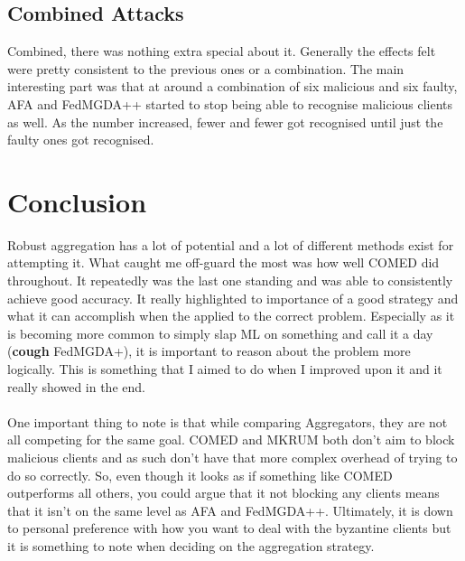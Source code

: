 \subsection{Combined Attacks}
Combined, there was nothing extra special about it.
Generally the effects felt were pretty consistent to the previous ones or a combination.
The main interesting part was that at around a combination of six malicious and six faulty, AFA and FedMGDA++ started to stop being able to recognise malicious clients as well.
As the number increased, fewer and fewer got recognised until just the faulty ones got recognised.

\section{Conclusion}
Robust aggregation has a lot of potential and a lot of different methods exist for attempting it.
What caught me off-guard the most was how well COMED did throughout.
It repeatedly was the last one standing and was able to consistently achieve good accuracy.
It really highlighted to importance of a good strategy and what it can accomplish when the applied to the correct problem.
Especially as it is becoming more common to simply slap ML on something and call it a day (\textbf{cough} FedMGDA+), it is important to reason about the problem more logically.
This is something that I aimed to do when I improved upon it and it really showed in the end.
\\ \\
One important thing to note is that while comparing Aggregators, they are not all competing for the same goal.
COMED and MKRUM both don't aim to block malicious clients and as such don't have that more complex overhead of trying to do so correctly.
So, even though it looks as if something like COMED outperforms all others, you could argue that it not blocking any clients means that it isn't on the same level as AFA and FedMGDA++.
Ultimately, it is down to personal preference with how you want to deal with the byzantine clients but it is something to note when deciding on the aggregation strategy.